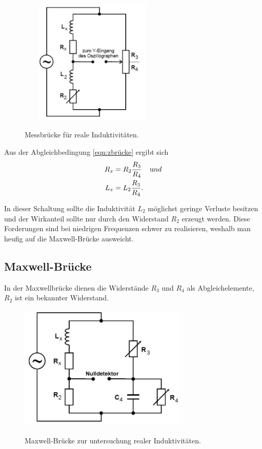 \begin{figure}[H]
  \centering
  \includegraphics[width=7cm,height=6cm]{induktivitat.JPG}
  \caption{Messbrücke für reale Induktivitäten.}
  \label{fig:induktivitat}
  \cite{skript}
\end{figure}
Aus der Abgleichbedingung \ref{eqn:zbrücke} ergibt sich
\begin{align}
  R_{x} &=R_{2}\frac{R_{3}}{R_{4}} \;\;\;\; \text und \\
  L_{x} &=L_{2}\frac{R_{3}}{R_{4}}.
\end{align}

\noindnent In dieser Schaltung sollte die Induktivität $L_{2}$ möglichst geringe Verluste besitzen und der
Wirkanteil sollte nur durch den Widerstand $R_{2}$ erzeugt werden. Diese
Forderungen sind bei niedrigen Frequenzen schwer zu realisieren, weshalb
man heufig auf die Maxwell-Brücke ausweicht.

\subsection{Maxwell-Brücke}
In der Maxwellbrücke dienen die Widerstände $R_{3}$ und $R_{4}$ als Abgleichelemente,
$R_{2}$ ist ein bekannter Widerstand.

\begin{figure}[H]
  \centering
  \includegraphics[width=8cm,height=6cm]{maxwell.JPG}
  \caption{Maxwell-Brücke zur untersuchung realer Induktivitäten.}
  \label{fig:maxwell}
  \cite{skript}
\end{figure}

